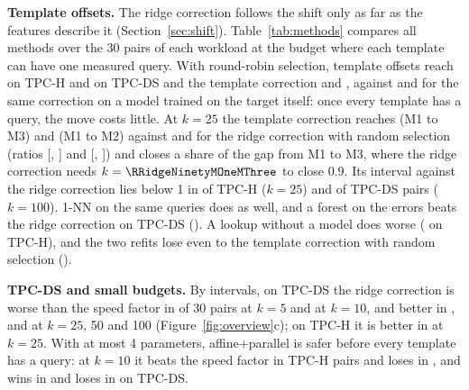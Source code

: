 \documentclass{article}
\newcommand{\inputif}[1]{\IfFileExists{#1}{}{}}
\begin{document}
\textbf{Template offsets.} The ridge correction follows the shift only as far as the features describe it (Section~\ref{sec:shift}). Table~\ref{tab:methods} compares all methods over the 30 pairs of each workload at the budget where each template can have one measured query. With round-robin selection, template offsets reach \PLadTpchTemplateRawRoundRobin{} on TPC-H and \PLadTpcdsTemplateRawRoundRobin{} on TPC-DS and the template correction \PLadTpchLowdimTemplateRoundRobin{} and \PLadTpcdsLowdimTemplateRoundRobin, against \PLadTpchLowdimTemplateControlRoundRobin{} and \PLadTpcdsLowdimTemplateControlRoundRobin{} for the same correction on a model trained on the target itself: once every template has a query, the move costs little. At $k=25$ the template correction reaches \RTcMOneMThree{} (M1 to M3) and \RTcMOneMTwo{} (M1 to M2) against \RRidgeMOneMThree{} and \RRidgeMOneMTwo{} for the ridge correction with random selection (ratios \RTcVsRidgeMOneMThree{} [\RTcVsRidgeMOneMThreeLo, \RTcVsRidgeMOneMThreeHi] and \RTcVsRidgeMOneMTwo{} [\RTcVsRidgeMOneMTwoLo, \RTcVsRidgeMOneMTwoHi]) and closes a share \RTcGapMOneMThree{} of the gap from M1 to M3, where the ridge correction needs $k=\RRidgeNinetyMOneMThree$ to close 0.9. Its interval against the ridge correction lies below 1 in \RTcBelowRidgeTpch{} of \RPairsTpch{} TPC-H ($k=25$) and \RTcBelowRidgeTpcds{} of \RPairsTpcds{} TPC-DS pairs ($k=100$). 1-NN on the same queries does as well, and a forest on the errors beats the ridge correction on TPC-DS (\PLadTpcdsForestResidRandom). A lookup without a model does worse (\PLadTpchLookupRoundRobin{} on TPC-H), and the two refits lose even to the template correction with random selection (\PLTpchKTwoFiveRandomLowdimTemplate).
\begin{table}[t]
\caption{Error at the budget that allows one query per template, geometric mean over the 30 ordered pairs of a workload. Last row: the template correction on a model trained on the target itself (no move), over the six environments.}
\label{tab:methods}
\centering\small
\inputif{results/report/table_methods.tex}
\end{table}

\textbf{TPC-DS and small budgets.} By intervals, on TPC-DS the ridge correction is worse than the speed factor in \RRidgeAboveTpcdsKFive{} of 30 pairs at $k=5$ and \RRidgeAboveTpcdsKOneZero{} at $k=10$, and better in \RRidgeBelowTpcdsKTwoFive, \RRidgeBelowTpcdsKFiveZero{} and \RRidgeBelowTpcdsKOneZeroZero{} at $k=25$, 50 and 100 (Figure~\ref{fig:overview}c); on TPC-H it is better in \RRidgeBelowTpchKTwoFive{} at $k=25$. With at most 4 parameters, affine+parallel is safer before every template has a query: at $k=10$ it beats the speed factor in \PAffTPCHBelow{} TPC-H pairs and loses in \PAffTPCHAbove, and wins in \PAffTPCDSBelow{} and loses in \PAffTPCDSAbove{} on TPC-DS.
\end{document}
